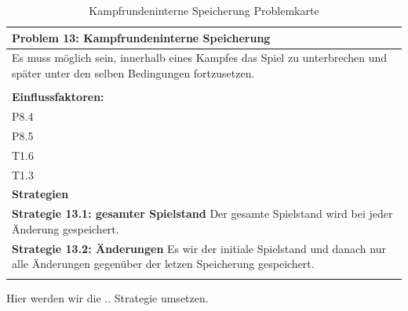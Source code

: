 \documentclass[fontsize=12pt,paper=a4,twoside]{scrartcl}
\begin{document}
\begin{table}[H]
    \centering
    \begin{tabular}{|p{15cm}|}
    \hline
          \textbf{Problem 13: Kampfrundeninterne Speicherung}  \\ \hline
	Es muss möglich sein, innerhalb eines Kampfes das Spiel zu unterbrechen und später unter den selben Bedingungen fortzusetzen. \\
         \\ \hline
          \textbf{Einflussfaktoren: } \\
	P8.4 \\
	P8.5 \\
	T1.6 \\
	T1.3 \\
          \hline
          \textbf{Strategien} \\ \hline
            {}          
           \label{strategie:13.1}     
          \textbf{Strategie 13.1: gesamter Spielstand} Der gesamte Spielstand wird bei jeder Änderung gespeichert.  \\        
  {}          
           \label{strategie:13.2}              
          \textbf{Strategie 13.2: Änderungen} Es wir der initiale Spielstand und danach nur alle Änderungen gegenüber der letzen Speicherung gespeichert.  \\
	 \\ \hline
    \end{tabular}

    \caption{Kampfrundeninterne Speicherung Problemkarte}
    \label{tab:ProblemKarte13}
\end{table}
Hier werden wir die .. Strategie umsetzen. \\
\end{document}
